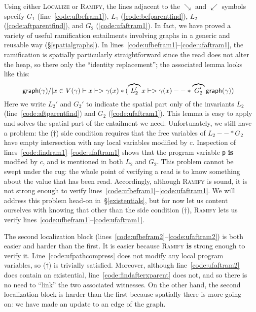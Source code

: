 Using either \textsc{Localize} or \textsc{Ramify}, the lines adjacent to the $\searrow$ and $\swarrow$ symbols specify $G_1$ (line~\ref{code:ufbefram1}), $L_1$ (\ref{code:befparentfind}),
$L_2$ (\ref{code:aftparentfind}), and $G_2$ (\ref{code:ufaftram1}). In fact, we have proved a variety of useful ramification entailments involving graphs in a generic and reusable way (\S\ref{spatialgraphs}).  In lines~\ref{code:ufbefram1}--\ref{code:ufaftram1}, the ramification is spatially particularly straightforward since the read does not alter the heap, so there only the ``identity replacement''; the associated lemma looks like this:
\[
\mathsf{graph}(\gamma) /| x \in V(\gamma) |- x |-> \gamma(x) * (\overbrace{L_2'}{x |-> \gamma(x)} --* \overbrace{G_2'}{\mathsf{graph}(\gamma)})
\]
Here we write $L_2'$ and $G_2'$ to indicate the spatial part only of the invariants $L_2$ (line~\ref{code:aftparentfind}) and $G_2$ (\ref{code:ufaftram1}).  This lemma is easy to apply and solves the spatial part of the entailment we need.  Unfortunately, we still have a problem: the ($\dagger$) side condition requires that the free variables of $L_2 --* G_2$ have empty intersection with any local variables modified by $c$.  Inspection of lines~\ref{code:findram1}--\ref{code:ufaftram1} shows that the program variable \texttt{p} \textbf{is} modfied by $c$, and is mentioned in both $L_2$ and $G_2$.  This problem cannot be swept under the rug: the whole point of verifying a read is to know something about the value that has been read.  Accordingly, although \textsc{Ramify} is sound, it is not strong enough to verify 
lines~\ref{code:ufbefram1}--\ref{code:ufaftram1}.  We will address this problem head-on in~\S\ref{existentials}, but for now let us content ourselves with knowing that other than the side condition ($\dagger$), \textsc{Ramify} lets us verify lines~\ref{code:ufbefram1}--\ref{code:ufaftram1}.

The second localization block (lines~\ref{code:ufbefram2}--\ref{code:ufaftram2}) is both easier and harder than the first.  It is easier because \textsc{Ramify} \textbf{is} strong enough to verify it. Line~\ref{code:ufpathcompress} does not modify any local program variables, so ($\dagger$) is trivially satisfied.  Moreover, although line~\ref{code:ufaftram2} does contain an existential, line~\ref{code:findafterxparent} does not, and so there is no need to ``link'' the two associated witnesses.  On the other hand, the second localization block is harder than the first because spatially there is more going on: we have made an update to an edge of the graph.

